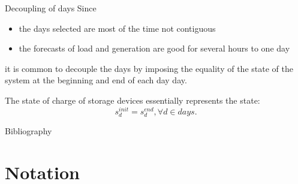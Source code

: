 \begin{frame}{Decoupling of days}
Since 
\begin{itemize}
    \item the days selected are most of the time not contiguous
    \item the forecasts of load and generation are good for several hours to one day
\end{itemize}
it is common to decouple the days by imposing the equality of the state of the system at the beginning and end of each day day.

The state of charge of storage devices essentially represents the state: 
$$s_d^{init} = s_d^{end}, \forall d \in days.$$
\end{frame}

\begin{frame}{Bibliography}
  \printbibliography[heading=none]
\end{frame}

\section{Notation}

